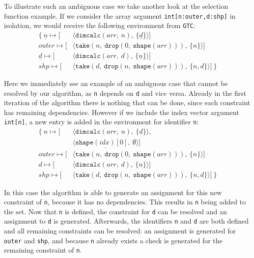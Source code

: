 To illustrate such an ambiguous case we take another look at the selection function example.
If we consider the array argument \texttt{int[n:outer,d:shp]} in isolation, we would receive the following environment \cenv{} from \texttt{GTC}:
\begin{align*}
    \mathbf{\{}\
        \underline{n} \mapsto [&\langle\texttt{dimcalc}(arr,\ n),\ \{\underline{d}\}\rangle] \\
        outer         \mapsto [&\langle\texttt{take}(n,\ \texttt{drop}(0,\ \texttt{shape}(arr))),\ \{n\}\rangle] \\
        \underline{d} \mapsto [&\langle\texttt{dimcalc}(arr,\ d),\ \{\underline{n}\}\rangle] \\
        shp           \mapsto [&\langle\texttt{take}(d,\ \texttt{drop}(n,\ \texttt{shape}(arr))),\ \{n,d\}\rangle]
    \ \mathbf{\}}
\end{align*}

\noindent
Here we immediately see an example of an ambiguous case that cannot be resolved by our algorithm, as \texttt{n} depends on \texttt{d} and vice versa.
Already in the first iteration of the algorithm there is nothing that can be done, since each constraint has remaining dependencies.
However if we include the index vector argument \texttt{int[n]}, a new entry is added in the environment for identifier \texttt{n}:
\begin{align*}
    \mathbf{\{}\
        n     \mapsto [&\langle\texttt{dimcalc}(arr,\ n),\ \{d\}\rangle, \\
            &\underline{\langle\texttt{shape}(idx)[0],\ \emptyset\rangle}] \\
        outer \mapsto [&\langle\texttt{take}(n,\ \texttt{drop}(0,\ \texttt{shape}(arr))),\ \{n\}\rangle] \\
        d     \mapsto [&\langle\texttt{dimcalc}(arr,\ d),\ \{n\}\rangle] \\
        shp   \mapsto [&\langle\texttt{take}(d,\ \texttt{drop}(n,\ \texttt{shape}(arr))),\ \{n,d\}\rangle]
    \ \mathbf{\}}
\end{align*}

\noindent
In this case the algorithm is able to generate an assignment for this new constraint of \texttt{n}, because it has no dependencies.
This results in \texttt{n} being added to the  set.
Now that \texttt{n} is defined, the constraint for \texttt{d} can be resolved and an assignment to \texttt{d} is generated.
Afterwards, the identifiers \texttt{n} and \texttt{d} are both defined and all remaining constraints can be resolved: an assignment is generated for \texttt{outer} and \texttt{shp}, and because \texttt{n} already exists a check is generated for the remaining constraint of \texttt{n}.
